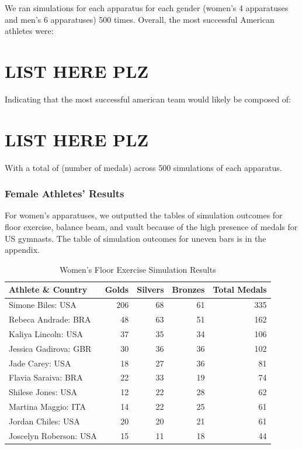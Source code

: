 \documentclass[
  letterpaper,
  DIV=11,
  numbers=noendperiod]{scrartcl}
\begin{document}
We ran simulations for each apparatus for each gender (women's 4
apparatuses and men's 6 apparatuses) 500 times. Overall, the most
successful American athletes were:

\hypertarget{list-here-plz}{%
\section{LIST HERE PLZ}\label{list-here-plz}}

Indicating that the most successful american team would likely be
composed of:

\hypertarget{list-here-plz-1}{%
\section{LIST HERE PLZ}\label{list-here-plz-1}}

With a total of (number of medals) across 500 simulations of each
apparatus.

\hypertarget{female-athletes-results}{%
\subsubsection{Female Athletes' Results}\label{female-athletes-results}}

For women's apparatuses, we outputted the tables of simulation outcomes
for floor exercise, balance beam, and vault because of the high presence
of medals for US gymnasts. The table of simulation outcomes for uneven
bars is in the appendix.

\begin{table}[H]

\caption{Women's Floor Exercise Simulation Results }
\centering
\fontsize{8}{10}\selectfont
\begin{tabular}[t]{l|r|r|r|r}
\hline
Athlete \& Country & Golds & Silvers & Bronzes & Total Medals\\
\hline
Simone Biles: USA & 206 & 68 & 61 & 335\\
\hline
Rebeca Andrade: BRA & 48 & 63 & 51 & 162\\
\hline
Kaliya Lincoln: USA & 37 & 35 & 34 & 106\\
\hline
Jessica Gadirova: GBR & 30 & 36 & 36 & 102\\
\hline
Jade Carey: USA & 18 & 27 & 36 & 81\\
\hline
Flavia Saraiva: BRA & 22 & 33 & 19 & 74\\
\hline
Shilese Jones: USA & 12 & 22 & 28 & 62\\
\hline
Martina Maggio: ITA & 14 & 22 & 25 & 61\\
\hline
Jordan Chiles: USA & 20 & 20 & 21 & 61\\
\hline
Joscelyn Roberson: USA & 15 & 11 & 18 & 44\\
\hline
\end{tabular}
\end{table}
\end{document}
